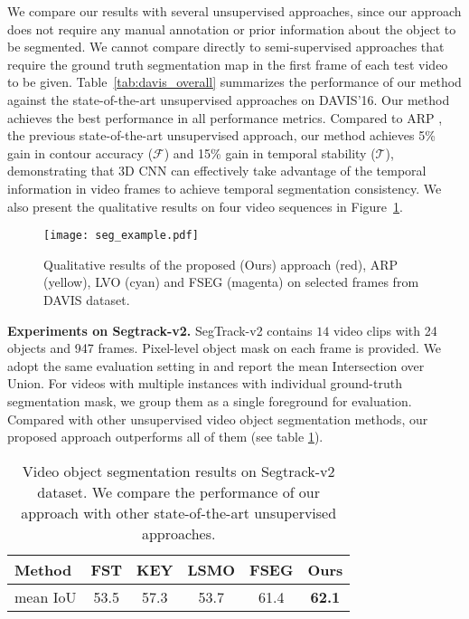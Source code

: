 \documentclass{bmvc2k}
\begin{document}
We compare our results with several unsupervised approaches, since our approach does not require any manual annotation or prior information about the object to be segmented.
We cannot compare directly to semi-supervised approaches that require the ground truth segmentation map in the first frame of each test video to be given. Table~\ref{tab:davis_overall} summarizes the performance of our method against the state-of-the-art unsupervised approaches on DAVIS'16. Our method achieves the best performance in all performance metrics. Compared to ARP \cite{koh2017primary}, the previous state-of-the-art unsupervised approach, our method achieves 5\% gain in contour accuracy ($\mathcal{F}$) and 15\% gain in temporal stability ($\mathcal{T}$), demonstrating that 3D CNN can effectively take advantage of the temporal information in video frames to achieve temporal segmentation consistency. We also present the qualitative results on four video sequences in Figure~\ref{fig:mtcnn_example}.


\begin{figure}[!htbp]
\centering
\texttt{[image: seg\_example.pdf]}
\caption{Qualitative results of the proposed (Ours) approach (red), ARP (yellow), LVO (cyan) and FSEG (magenta) on selected frames from DAVIS dataset.}
\label{fig:mtcnn_example}
\end{figure}

\textbf{Experiments on Segtrack-v2.} SegTrack-v2 \cite{li2013video} contains $14$ video clips with 24 objects and 947 frames. Pixel-level object mask on each frame is provided. We adopt the same evaluation setting in \cite{khoreva2016learning} and report the mean Intersection over Union. For videos with multiple instances with individual ground-truth segmentation mask, we group them as a single foreground for evaluation. Compared with other unsupervised video object segmentation methods, our proposed approach outperforms all of them (see table \ref {tab:segtrack}).
\begin{table}[]
\centering
\small
\begin{tabular}{l|ccccc}
\hline
Method      & FST \cite{papazoglou2013fast}  & KEY \cite{lee2011key}  & LSMO \cite{tokmakov2017learning} & FSEG \cite{jain2017fusionseg} & Ours \\
\hline
mean IoU    & 53.5  & 57.3  & 53.7  & 61.4  & {\bf 62.1} \\   
\hline
\end{tabular}
\caption{Video object segmentation results on Segtrack-v2 dataset. We compare the performance of our approach with other state-of-the-art unsupervised approaches.}
\label{tab:segtrack}
\end{table}
\end{document}
